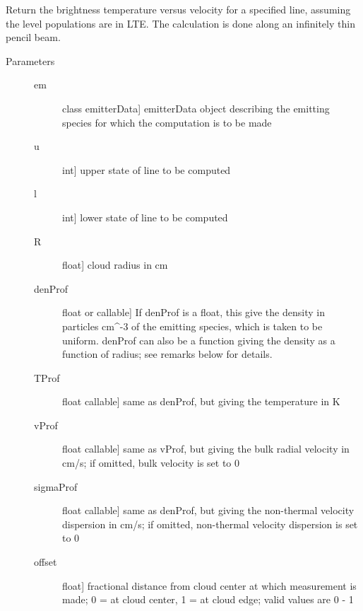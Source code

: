 \documentclass[letterpaper,10pt,english]{sphinxmanual}
\begin{document}
\begin{fulllineitems}
\label{fulldoc:despotic.lineProfLTE}
Return the brightness temperature versus velocity for a
specified line, assuming the level populations are in LTE. The
calculation is done along an infinitely thin pencil beam.
\begin{description}
\item[{Parameters}] \leavevmode\begin{description}
\item[{em}] \leavevmode{[}class emitterData{]}
emitterData object describing the emitting species for
which the computation is to be made

\item[{u}] \leavevmode{[}int{]}
upper state of line to be computed

\item[{l}] \leavevmode{[}int{]}
lower state of line to be computed

\item[{R}] \leavevmode{[}float{]}
cloud radius in cm

\item[{denProf}] \leavevmode{[}float or callable{]}
If denProf is a float, this give the density in particles
cm\textasciicircum{}-3 of the emitting species, which is taken to be
uniform. denProf can also be a function giving the density
as a function of radius; see remarks below for details.

\item[{TProf}] \leavevmode{[}float \textbar{} callable{]}
same as denProf, but giving the temperature in K

\item[{vProf}] \leavevmode{[}float \textbar{} callable{]}
same as vProf, but giving the bulk radial
velocity in cm/s; if omitted, bulk velocity is set to 0

\item[{sigmaProf}] \leavevmode{[}float \textbar{} callable{]}
same as denProf, but giving the non-thermal
velocity dispersion in cm/s; if omitted, non-thermal
velocity dispersion is set to 0

\item[{offset}] \leavevmode{[}float{]}
fractional distance from cloud center at which
measurement is made; 0 = at cloud center, 1 = at
cloud edge; valid values are 0 - 1


\end{description}
\end{description}
\end{fulllineitems}
\end{document}
